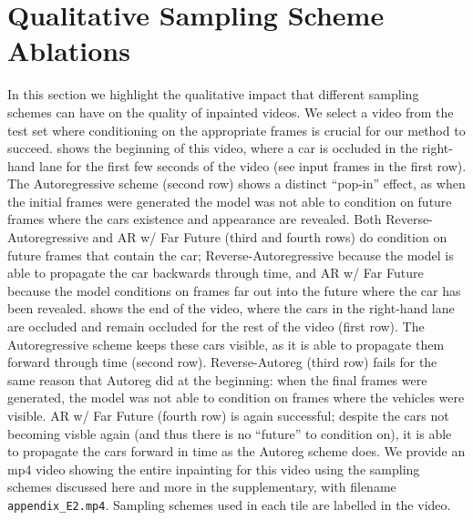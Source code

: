 \section{Qualitative Sampling Scheme Ablations}
\label{sec:quall}
In this section we highlight the qualitative impact that different sampling schemes can have on the quality of inpainted videos. We select a video from the test set where conditioning on the appropriate frames is crucial for our method to succeed.  shows the beginning of this video, where a car is occluded in the right-hand lane for the first few seconds of the video (see input frames in the first row). The Autoregressive scheme (second row) shows a distinct ``pop-in'' effect, as when the initial frames were generated the model was not able to condition on future frames where the cars existence and appearance are revealed. Both Reverse-Autoregressive and AR w/ Far Future (third and fourth rows) do condition on future frames that contain the car; Reverse-Autoregressive because the model is able to propagate the car backwards through time, and AR w/ Far Future because the model conditions on frames far out into the future where the car has been revealed.  shows the end of the video, where the cars in the right-hand lane are occluded and remain occluded for the rest of the video (first row). The Autoregressive scheme keeps these cars visible, as it is able to propagate them forward through time (second row). Reverse-Autoreg (third row) fails for the same reason that Autoreg did at the beginning: when the final frames were generated, the model was not able to condition on frames where the vehicles were visible. AR w/ Far Future (fourth row) is again successful; despite the cars not becoming visble again (and thus there is no ``future'' to condition on), it is able to propagate the cars forward in time as the Autoreg scheme does. We provide an mp4 video showing the entire inpainting for this video using the sampling schemes discussed here and more in the supplementary, with filename \texttt{appendix\_E2.mp4}. Sampling schemes used in each tile are labelled in the video.
